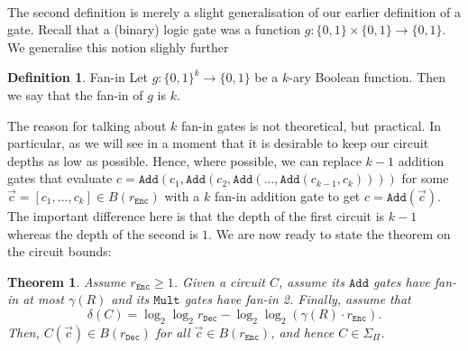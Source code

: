 \documentclass{article}
\newtheorem{theorem}{Theorem}[section]
\theoremstyle{definition}
\newtheorem{definition}{Definition}[section]
\theoremstyle{example}
\newcommand{\Enc}{\texttt{Enc}}
\newcommand{\Dec}{\texttt{Dec}}
\newcommand{\Add}{\texttt{Add}}
\newcommand{\Mult}{\texttt{Mult}}
\begin{document}
\paragraph{} The second definition is merely a slight generalisation of our earlier
definition of a gate. Recall that a (binary) logic gate was a function $g: \{0,
1\} \times \{0, 1\} \to \{0, 1\}$. We generalise this notion slighly further
\begin{definition}{Fan-in}
  Let $g: \{0, 1\}^k \to \{0, 1\}$ be a $k$-ary Boolean function. Then we say
  that the fan-in of $g$ is $k$. 
\end{definition}
The reason for talking about $k$ fan-in gates is not theoretical, but practical.
In particular, as we will see in a moment that it is desirable to keep our
circuit depths as low as possible. Hence, where possible, we can replace $k - 1$
addition gates that evaluate $c = \Add(c_1, \Add(c_2, \Add(\hdots, \Add(c_{k-1},
c_{k}))))$ for some $\vec{c} = [c_1, \hdots, c_k] \in B(r_\Enc)$ with a $k$
fan-in addition gate to get $c = \Add(\vec{c})$. The important difference here
is that the depth of the first circuit is $k-1$ whereas the depth of the second
is $1$.
We are now ready to state the theorem on the circuit bounds:
\begin{theorem}
  Assume $r_\Enc \geq 1$. Given a circuit $C$, assume its $\Add$ gates have
  fan-in at most $\gamma(R)$ and its $\Mult$ gates have fan-in 2.
  Finally, assume that
  \[
    \delta(C) = \log_2\log_2 r_\Dec - \log_2\log_2(\gamma(R) \cdot r_\Enc).
  \]
  Then, $C(\vec{c}) \in B(r_\Dec)$ for all $\vec{c} \in B(r_\Enc)$, and hence $C
  \in \Sigma_\Pi$.
\end{theorem}
\end{document}
